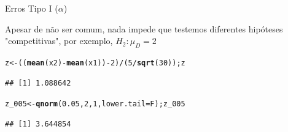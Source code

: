 \documentclass{beamer}\usepackage[]{graphicx}\usepackage[]{color}
\makeatletter
\newcommand{\hlnum}[1]{\textcolor[rgb]{0.686,0.059,0.569}{#1}}%
\newcommand{\hlopt}[1]{\textcolor[rgb]{0,0,0}{#1}}%
\newcommand{\hlstd}[1]{\textcolor[rgb]{0.345,0.345,0.345}{#1}}%
\newcommand{\hlkwb}[1]{\textcolor[rgb]{0.69,0.353,0.396}{#1}}%
\newcommand{\hlkwc}[1]{\textcolor[rgb]{0.333,0.667,0.333}{#1}}%
\newcommand{\hlkwd}[1]{\textcolor[rgb]{0.737,0.353,0.396}{\textbf{#1}}}%
\newenvironment{kframe}{%
 \def\at@end@of@kframe{}%
 \ifinner\ifhmode%
  \def\at@end@of@kframe{\end{minipage}}%
  \begin{minipage}{\columnwidth}%
 \fi\fi%
 \def\FrameCommand##1{\hskip\@totalleftmargin \hskip-\fboxsep
 \colorbox{shadecolor}{##1}\hskip-\fboxsep
     \hskip-\linewidth \hskip-\@totalleftmargin \hskip\columnwidth}%
 \MakeFramed {\advance\hsize-\width
   \@totalleftmargin\z@ \linewidth\hsize
   \@setminipage}}%
 {\par\unskip\endMakeFramed%
 \at@end@of@kframe}
\newenvironment{knitrout}{}{} %
\renewenvironment{knitrout}{\setlength{\topsep}{0mm}}{}
\makeatother
\begin{document}
\begin{frame}[fragile]{Erros Tipo I ($\alpha$)}

Apesar de não ser comum, nada impede que testemos diferentes hipóteses "competitivas", por exemplo, $H_2: \mu_D = 2$
\vfill
\begin{knitrout}\tiny
{}\color{fgcolor}\begin{kframe}
\begin{alltt}
\hlstd{z}\hlkwb{<-} \hlstd{((}\hlkwd{mean}\hlstd{(x2)}\hlopt{-}\hlkwd{mean}\hlstd{(x1))} \hlopt{-} \hlnum{2}\hlstd{)}\hlopt{/} \hlstd{(}\hlnum{5}\hlopt{/}\hlkwd{sqrt}\hlstd{(}\hlnum{30}\hlstd{)); z}
\end{alltt}
\begin{verbatim}
## [1] 1.088642
\end{verbatim}
\begin{alltt}
\hlstd{z_005} \hlkwb{<-} \hlkwd{qnorm}\hlstd{(}\hlnum{0.05}\hlstd{,}\hlnum{2}\hlstd{,}\hlnum{1}\hlstd{,}\hlkwc{lower.tail}\hlstd{=F); z_005}
\end{alltt}
\begin{verbatim}
## [1] 3.644854
\end{verbatim}
\end{kframe}
\end{knitrout}

\end{frame}
\end{document}
